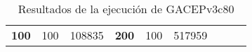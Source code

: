 \begin{table}[H]
\begin{tabular}{|ccrccrccc}
\multicolumn{1}{|c|}{\multirow{-39}{*}{\cellcolor[HTML]{FFFFC7}\textbf{100}}} & \multicolumn{1}{c|}{\multirow{-9}{*}{\cellcolor[HTML]{DDFDFF}100}} & \multicolumn{1}{r|}{\cellcolor[HTML]{DAE8FC}108835}    & \multicolumn{1}{c|}{\multirow{-39}{*}{\cellcolor[HTML]{FFFFC7}\textbf{200}}} & \multicolumn{1}{c|}{\multirow{-10}{*}{\cellcolor[HTML]{DDFDFF}100}} & \multicolumn{1}{r|}{\cellcolor[HTML]{DDFDFF}517959}    &                                                                              &                                                                    &                                                        \\ \cline{1-6}
\end{tabular}
\caption{\label{GACEPv3c80GRASP}Resultados de la ejecución de GACEPv3c80}

\end{table}

